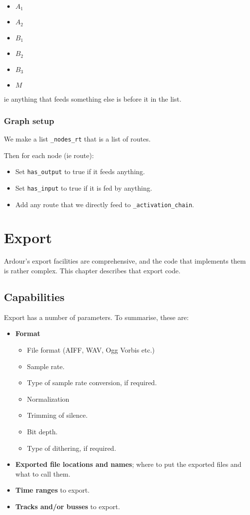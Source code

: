 \documentclass[10pt,a4paper]{book}
\newcommand{\code}[1]{\texttt{#1}}
\begin{document}
\begin{itemize}
\item $A_1$
\item $A_2$
\item $B_1$
\item $B_2$
\item $B_3$
\item $M$
\end{itemize}

ie anything that feeds something else is before it in the list.

\subsection{Graph setup}

We make a list \code{\_nodes\_rt} that is a list of routes.

Then for each node (ie route):

\begin{itemize}
\item Set \code{has\_output} to true if it feeds anything.
\item Set \code{has\_input} to true if it is fed by anything.
\item Add any route that we directly feed to \code{\_activation\_chain}.
\end{itemize}

\chapter{Export}

Ardour's export facilities are comprehensive, and the code that
implements them is rather complex.  This chapter describes that export code.

\section{Capabilities}

Export has a number of parameters.  To summarise, these are:

\begin{itemize}
\item \textbf{Format}
  \begin{itemize}
  \item File format (AIFF, WAV, Ogg Vorbis etc.)
  \item Sample rate.
  \item Type of sample rate conversion, if required.
  \item Normalization
  \item Trimming of silence.
  \item Bit depth.
  \item Type of dithering, if required.
  \end{itemize}
\item \textbf{Exported file locations and names}; where to put the exported files and what to call them.
\item \textbf{Time ranges} to export.
\item \textbf{Tracks and/or busses} to export.
\end{itemize}
\end{document}
